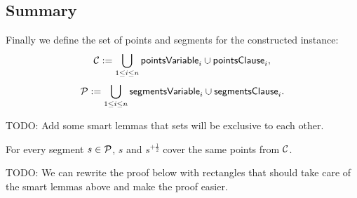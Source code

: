 \subsection{Summary}



Finally we define the set of points and segments for the constructed instance:
$$\mathcal{C} := \bigcup_{1 \le i \le n} \mathsf{pointsVariable}_{i} \cup \mathsf{pointsClause}_{i},$$
$$\mathcal{P} := \bigcup_{1 \le i \le n} \mathsf{segmentsVariable}_{i} \cup \mathsf{segmentsClause}_i.$$


TODO: Add some smart lemmas that sets will be exclusive to each other.

\begin{lemma}
\label{lemma:exntension_robust}
For every segment $s \in \mathcal{P}$,
$s$ and $s^{+\frac{1}{2}}$ cover the same points from $\mathcal{C}$.
\end{lemma}

TODO: We can rewrite the proof below with rectangles
that should take care of the smart lemmas above and make the proof easier.

